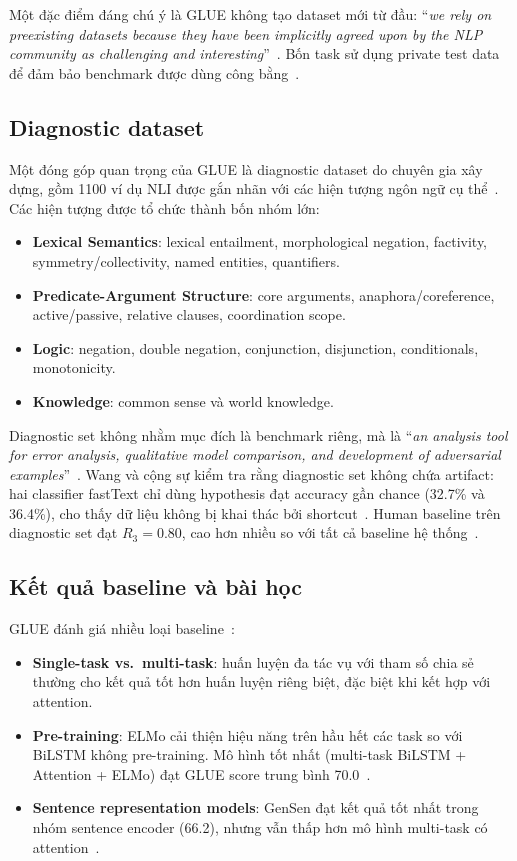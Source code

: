 Một đặc điểm đáng chú ý là GLUE không tạo dataset mới từ đầu: ``\textit{we rely on preexisting datasets because they have been implicitly agreed upon by the NLP community as challenging and interesting}''~\cite{glue}. Bốn task sử dụng private test data để đảm bảo benchmark được dùng công bằng~\cite{glue}.

\subsection{Diagnostic dataset}

Một đóng góp quan trọng của GLUE là diagnostic dataset do chuyên gia xây dựng, gồm 1100 ví dụ NLI được gắn nhãn với các hiện tượng ngôn ngữ cụ thể~\cite{glue}. Các hiện tượng được tổ chức thành bốn nhóm lớn:

\begin{itemize}
    \item \textbf{Lexical Semantics}: lexical entailment, morphological negation, factivity, symmetry/collectivity, named entities, quantifiers.
    \item \textbf{Predicate-Argument Structure}: core arguments, anaphora/coreference, active/passive, relative clauses, coordination scope.
    \item \textbf{Logic}: negation, double negation, conjunction, disjunction, conditionals, monotonicity.
    \item \textbf{Knowledge}: common sense và world knowledge.
\end{itemize}

Diagnostic set không nhằm mục đích là benchmark riêng, mà là ``\textit{an analysis tool for error analysis, qualitative model comparison, and development of adversarial examples}''~\cite{glue}. Wang và cộng sự kiểm tra rằng diagnostic set không chứa artifact: hai classifier fastText chỉ dùng hypothesis đạt accuracy gần chance (32.7\% và 36.4\%), cho thấy dữ liệu không bị khai thác bởi shortcut~\cite{glue}. Human baseline trên diagnostic set đạt $R_3 = 0.80$, cao hơn nhiều so với tất cả baseline hệ thống~\cite{glue}.

\subsection{Kết quả baseline và bài học}

GLUE đánh giá nhiều loại baseline~\cite{glue}:

\begin{itemize}
    \item \textbf{Single-task vs.\ multi-task}: huấn luyện đa tác vụ với tham số chia sẻ thường cho kết quả tốt hơn huấn luyện riêng biệt, đặc biệt khi kết hợp với attention.
    \item \textbf{Pre-training}: ELMo cải thiện hiệu năng trên hầu hết các task so với BiLSTM không pre-training. Mô hình tốt nhất (multi-task BiLSTM + Attention + ELMo) đạt GLUE score trung bình 70.0~\cite{glue}.
    \item \textbf{Sentence representation models}: GenSen đạt kết quả tốt nhất trong nhóm sentence encoder (66.2), nhưng vẫn thấp hơn mô hình multi-task có attention~\cite{glue}.
\end{itemize}

